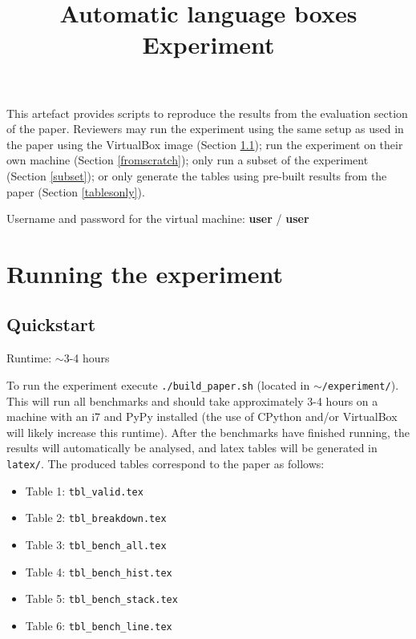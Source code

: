 \documentclass[12pt,a4paper]{article}
\begin{document}
\title{Automatic language boxes\\Experiment}
\maketitle

This artefact provides scripts to reproduce the results from the evaluation
section of the paper. Reviewers may run the experiment using the same setup as
used in the paper using the VirtualBox image (Section \ref{quickstart}); run
the experiment on their own machine (Section \ref{fromscratch}); only run a
subset of the experiment (Section \ref{subset}); or only generate the tables
using pre-built results from the paper (Section \ref{tablesonly}).

\noindent Username and password for the virtual machine: \textbf{user} / \textbf{user}

\section{Running the experiment}

\subsection{Quickstart}
\label{quickstart}

Runtime: $\sim$3-4 hours

\noindent To run the experiment execute \texttt{./build\_paper.sh} (located in
\texttt{$\sim$/experiment/}). This will run all benchmarks and should take
approximately 3-4 hours on a machine with an i7 and PyPy installed (the use of
CPython and/or VirtualBox will likely increase this runtime). After the
benchmarks have finished running, the results will automatically be analysed,
and latex tables will be generated in \texttt{latex/}. The produced tables
correspond to the paper as follows:

\begin{itemize}
    \item Table 1: \texttt{tbl\_valid.tex}
    \item Table 2: \texttt{tbl\_breakdown.tex}
    \item Table 3: \texttt{tbl\_bench\_all.tex}
    \item Table 4: \texttt{tbl\_bench\_hist.tex}
    \item Table 5: \texttt{tbl\_bench\_stack.tex}
    \item Table 6: \texttt{tbl\_bench\_line.tex}
\end{itemize}
\end{document}
